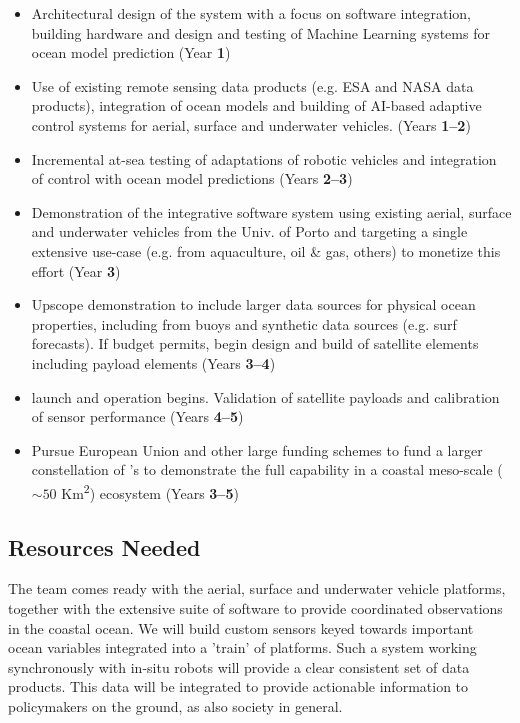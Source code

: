 \documentclass[12pt]{article}
\begin{document}
\begin{itemize}[noitemsep,topsep=0pt,parsep=0pt,partopsep=0pt]

\item Architectural design of the system with a focus on software
  integration, building hardware and design and testing of Machine
  Learning systems for ocean model prediction (Year \textbf{1})

\item Use of existing remote sensing data products (e.g. ESA and NASA
  data products), integration of ocean models and building of AI-based
  adaptive control systems for aerial, surface and underwater
  vehicles.  (Years \textbf{1--2})

\item Incremental at-sea testing of adaptations of robotic vehicles
  and integration of control with ocean model predictions (Years
  \textbf{2--3}) 

\item Demonstration of the integrative software system using existing
  aerial, surface and underwater vehicles from the Univ. of Porto and
  targeting a single extensive use-case (e.g. from aquaculture, oil \&
  gas, others) to monetize this effort (Year \textbf{3})

\item Upscope demonstration to include larger data sources for
  physical ocean properties, including from buoys and synthetic data
  sources (e.g. surf forecasts). If \sml budget permits, begin design
  and build of satellite elements including payload elements (Years
  \textbf{3--4})

\item \sml launch and operation begins. Validation of satellite
  payloads and calibration of sensor performance (Years \textbf{4--5})

\item Pursue European Union and other large funding schemes to fund a
  larger constellation of \smle's to demonstrate the full capability
  in a coastal meso-scale ($\sim 50$ Km\textsuperscript{2}) ecosystem
  (Years \textbf{3--5})

\end{itemize}

\subsection{Resources Needed}

The \pro team comes ready with the aerial, surface and underwater
vehicle platforms, together with the extensive suite of software to
provide coordinated observations in the coastal ocean. We will build
custom sensors keyed towards important ocean variables integrated into
a 'train' of \sml platforms.  Such a system working synchronously with
in-situ robots will provide a clear consistent set of data
products. This data will be integrated to provide actionable
information to policymakers on the ground, as also society in general.
\end{document}
